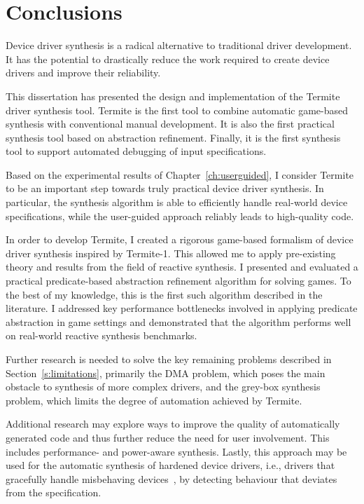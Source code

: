 \chapter{Conclusions}

Device driver synthesis is a radical alternative to traditional driver development. It has the potential to drastically reduce the work required to create device drivers and improve their reliability.

This dissertation has presented the design and implementation of the Termite driver synthesis tool. Termite is the first tool to combine automatic game-based synthesis with conventional manual development. It is also the first practical synthesis tool based on abstraction refinement. Finally, it is the first synthesis tool to support automated debugging of input specifications. 

Based on the experimental results of Chapter~\ref{ch:userguided}, I consider Termite to be an important step towards truly practical device driver synthesis.  In particular, the synthesis algorithm is able to efficiently handle real-world device specifications, while the user-guided approach reliably leads to high-quality code.

In order to develop Termite, I created a rigorous game-based formalism of device driver synthesis inspired by Termite-1. This allowed me to apply pre-existing theory and results from the field of reactive synthesis. I presented and evaluated a practical predicate-based abstraction refinement algorithm for solving games. To the best of my knowledge, this is the first such algorithm described in the literature. I addressed key performance bottlenecks involved in applying predicate abstraction in game settings and demonstrated that the algorithm performs well on real-world reactive synthesis benchmarks. 

Further research is needed to solve the key remaining problems described in Section~\ref{s:limitations}, primarily the DMA problem, which poses the main obstacle to synthesis of more complex drivers, and the grey-box synthesis problem, which limits the degree of automation achieved by Termite. 

Additional research may explore ways to improve the quality of automatically generated code and thus further reduce the need for user involvement. This includes performance- and power-aware synthesis. Lastly, this approach may be used for the automatic synthesis of hardened device drivers, i.e., drivers that gracefully handle misbehaving devices~\cite{Kadav_RS_09}, by detecting behaviour that deviates from the specification.

